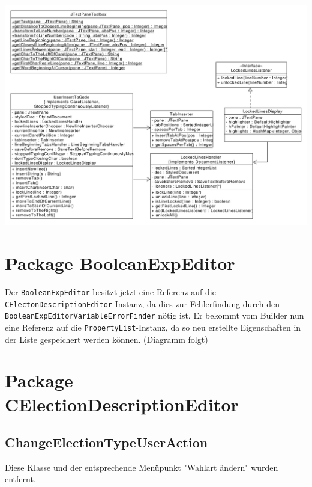 \documentclass[a4paper]{scrreprt}
\begin{document}
\includegraphics[scale=0.45]{inputtocode_update.pdf}

\section{Package BooleanExpEditor}
Der \verb!BooleanExpEditor! besitzt jetzt eine Referenz auf die \verb!CElectonDescriptionEditor!-Instanz, da dies zur Fehlerfindung durch den \verb!BooleanExpEditorVariableErrorFinder! nötig ist.
\newline
Er bekommt vom Builder nun eine Referenz auf die \verb!PropertyList!-Instanz, da so neu erstellte Eigenschaften in der Liste gespeichert werden können.
\newline
(Diagramm folgt)
\newline

\section{Package CElectionDescriptionEditor}

\subsection{ChangeElectionTypeUserAction}
Diese Klasse und der entsprechende Menüpunkt "Wahlart ändern" wurden entfernt.
\end{document}

